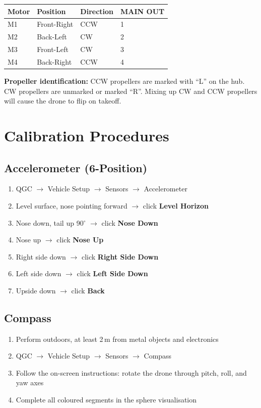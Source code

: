 \documentclass{article}
\begin{document}
\begin{center}
\begin{tabular}{llll}
\toprule
\textbf{Motor} & \textbf{Position} & \textbf{Direction} & \textbf{MAIN OUT} \\
\midrule
M1 & Front-Right & CCW & 1 \\
M2 & Back-Left   & CW  & 2 \\
M3 & Front-Left  & CW  & 3 \\
M4 & Back-Right  & CCW & 4 \\
\bottomrule
\end{tabular}
\end{center}

\textbf{Propeller identification:} CCW propellers are marked with ``L'' on the hub. CW propellers are unmarked or marked ``R''. Mixing up CW and CCW propellers will cause the drone to flip on takeoff.

\section{Calibration Procedures}
\label{app:calibration}

\subsection*{Accelerometer (6-Position)}
\begin{enumerate}
    \item QGC $\rightarrow$ Vehicle Setup $\rightarrow$ Sensors $\rightarrow$ Accelerometer
    \item Level surface, nose pointing forward $\rightarrow$ click \textbf{Level Horizon}
    \item Nose down, tail up 90$^\circ$ $\rightarrow$ click \textbf{Nose Down}
    \item Nose up $\rightarrow$ click \textbf{Nose Up}
    \item Right side down $\rightarrow$ click \textbf{Right Side Down}
    \item Left side down $\rightarrow$ click \textbf{Left Side Down}
    \item Upside down $\rightarrow$ click \textbf{Back}
\end{enumerate}

\subsection*{Compass}
\begin{enumerate}
    \item Perform outdoors, at least 2\,m from metal objects and electronics
    \item QGC $\rightarrow$ Vehicle Setup $\rightarrow$ Sensors $\rightarrow$ Compass
    \item Follow the on-screen instructions: rotate the drone through pitch, roll, and yaw axes
    \item Complete all coloured segments in the sphere visualisation
\end{enumerate}
\end{document}
